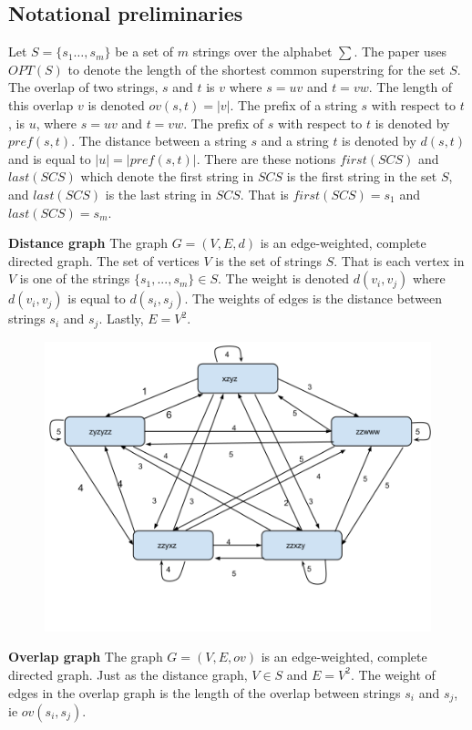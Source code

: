 \documentclass[letterpaper,11pt,titlepage]{article}
\begin{document}
\subsection*{Notational preliminaries}

Let $S = \{s_1 \ldots, s_m\}$ be a set of $m$ strings over the alphabet $\sum$. The paper uses $OPT(S)$ to denote the length of the shortest common superstring for the set $S$. The overlap of two strings, $s$ and $t$ is $v$ where $s=uv$ and $t=vw$. The length of this overlap $v$ is denoted $ov(s,t) = |v|$. The prefix of a string $s$ with respect to $t$, is $u$, where $s=uv$ and $t=vw$. The prefix of $s$ with respect to $t$ is denoted by $pref(s,t)$. The distance between a string $s$ and a string $t$ is denoted by $d(s,t)$ and is equal to $|u| = |pref(s,t)|$. There are these notions $first(SCS)$ and $last(SCS)$ which denote the first string in $SCS$ is the first string in the set $S$, and $last(SCS)$ is the last string in $SCS$. That is $first(SCS) = s_1$ and $last(SCS) = s_m$.

\newpage

\textbf{Distance graph}
The graph $G = (V,E,d)$ is an edge-weighted, complete directed graph. The set of vertices $V$ is the set of strings $S$. That is each vertex in $V$ is one of the strings $\{s_1, ..., s_m\} \in S$. The weight is denoted $d(v_i,v_j)$ where $d(v_i,v_j)$ is equal to $d(s_i,s_j)$. The weights of edges is the distance between strings $s_i$ and $s_j$. Lastly, $E=V^2$.

\begin{figure}[h]
 \centering
   \includegraphics[width=.6\textwidth]{distance.png}
\end{figure}


\textbf{Overlap graph}
The graph $G = (V,E,ov)$ is an edge-weighted, complete directed graph. Just as the distance graph, $V \in S$ and $E=V^2$. The weight of edges in the overlap graph is the length of the overlap between strings $s_i$ and $s_j$, ie $ov(s_i,s_j)$. 
\end{document}
